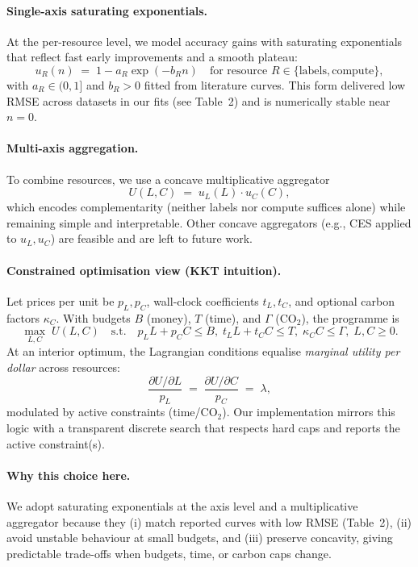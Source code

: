 \documentclass[11pt]{article}
\begin{document}
\paragraph{Single-axis saturating exponentials.}
At the per-resource level, we model accuracy gains with saturating exponentials that reflect fast early improvements and a smooth plateau:
\[
u_R(n) \;=\; 1 - a_R \exp(-b_R n)
\quad\text{for resource } R\in\{\text{labels},\text{compute}\},
\]
with $a_R\in(0,1]$ and $b_R>0$ fitted from literature curves. This form delivered low RMSE across datasets in our fits (see Table~2) and is numerically stable near $n=0$.

\paragraph{Multi-axis aggregation.}
To combine resources, we use a concave multiplicative aggregator
\[
U(L,C)\;=\; u_L(L)\cdot u_C(C),
\]
which encodes complementarity (neither labels nor compute suffices alone) while remaining simple and interpretable. Other concave aggregators (e.g., CES applied to $u_L,u_C$) are feasible and are left to future work.

\paragraph{Constrained optimisation view (KKT intuition).}
Let prices per unit be $p_L,p_C$, wall-clock coefficients $t_L,t_C$, and optional carbon factors $\kappa_C$. With budgets $B$ (money), $T$ (time), and $\Gamma$ (CO$_2$), the programme is
\[
\max_{L,C}\; U(L,C)
\quad \text{s.t.}\quad
p_L L + p_C C \le B,\;
t_L L + t_C C \le T,\;
\kappa_C C \le \Gamma,\;
L,C \ge 0.
\]
At an interior optimum, the Lagrangian conditions equalise \emph{marginal utility per dollar} across resources:
\[
\frac{\partial U/\partial L}{p_L}
\;=\;
\frac{\partial U/\partial C}{p_C}
\;=\;
\lambda,
\]
modulated by active constraints (time/CO$_2$). Our implementation mirrors this logic with a transparent discrete search that respects hard caps and reports the active constraint(s).

\paragraph{Why this choice here.}
We adopt saturating exponentials at the axis level and a multiplicative aggregator because they (i) match reported curves with low RMSE (Table~2), (ii) avoid unstable behaviour at small budgets, and (iii) preserve concavity, giving predictable trade-offs when budgets, time, or carbon caps change.
\end{document}
